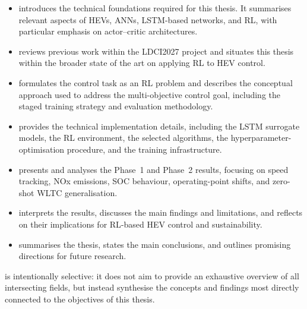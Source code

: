\begin{itemize}
  \item {} introduces the technical foundations required for this thesis. It summarises relevant aspects of \acp{HEV}, \acp{ANN}, \ac{LSTM}-based networks, and \ac{RL}, with particular emphasis on actor--critic architectures.
  \item {} reviews previous work within the \ac{LDCI2027} project and situates this thesis within the broader state of the art on applying \ac{RL} to \ac{HEV} control.
  \item {} formulates the control task as an \ac{RL} problem and describes the conceptual approach used to address the multi-objective control goal, including the staged training strategy and evaluation methodology.
  \item {} provides the technical implementation details, including the \ac{LSTM} surrogate models, the \ac{RL} environment, the selected algorithms, the hyperparameter-optimisation procedure, and the training infrastructure.
  \item {} presents and analyses the Phase~1 and Phase~2 results, focusing on speed tracking, \ac{NOx} emissions, \ac{SOC} behaviour, operating-point shifts, and zero-shot \ac{WLTC} generalisation.
  \item {} interprets the results, discusses the main findings and limitations, and reflects on their implications for \ac{RL}-based \ac{HEV} control and sustainability.
  \item {} summarises the thesis, states the main conclusions, and outlines promising directions for future research.
\end{itemize}

 is intentionally selective: it does not aim to provide an exhaustive overview of all intersecting fields, but instead synthesise the concepts and findings most directly connected to the objectives of this thesis.
